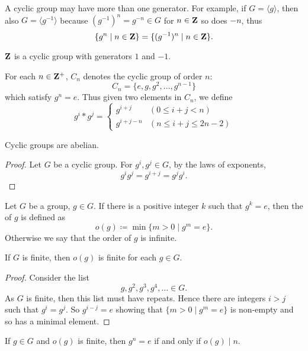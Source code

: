 \begin{remark}
A cyclic group may have more than one generator. For example, if $G=\langle g\rangle$, then also $G=\langle g^{-1}\rangle$ because $(g^{-1})^n=g^{-n}\in G$ for $n\in\mathbf Z$ so does $-n$, thus
\[\{g^n\mid n\in\mathbf Z\}=\{(g^{-1})^n\mid n\in\mathbf Z\}.\] 
\end{remark}

\begin{example}
$\mathbf Z$ is a cyclic group with generators $1$ and $-1$.
\end{example}

\begin{notation}
For each $n\in\mathbf Z^+$, $C_n$ denotes the cyclic group of order $n$:
\[C_n=\{e,g,g^2,\dots,g^{n-1}\}\]
which satisfy $g^n=e$. Thus given two elements in $C_n$, we define
\[g^i\ast g^j=\begin{cases}
g^{i+j}&(0\le i+j<n)\\
g^{i+j-n}&(n\le i+j\le 2n-2)
\end{cases}\]
\end{notation}

\begin{proposition}
Cyclic groups are abelian.
\end{proposition}

\begin{proof}
Let $G$ be a cyclic group. For $g^i,g^j\in G$, by the laws of exponents,
\[g^i g^j=g^{i+j}=g^j g^i.\]
\end{proof}

\begin{definition}[Order]
Let $G$ be a group, $g\in G$. If there is a positive integer $k$ such that $g^k=e$, then the  of $g$ is defined as
\[o(g)\coloneqq\min\{m>0\mid g^m=e\}.\]
Otherwise we say that the order of $g$ is infinite.
\end{definition}

\begin{proposition}
If $G$ is finite, then $o(g)$ is finite for each $g\in G$.
\end{proposition}

\begin{proof}
Consider the list
\[g,g^2,g^3,g^4,\dots\in G.\]
As $G$ is finite, then this list must have repeats. Hence there are integers $i>j$ such that $g^i=g^j$. So $g^{i-j}=e$ showing that $\{m>0\mid g^m=e\}$ is non-empty and so has a minimal element.
\end{proof}

\begin{proposition}
If $g\in G$ and $o(g)$ is finite, then $g^n=e$ if and only if $o(g)\mid n$.
\end{proposition}

